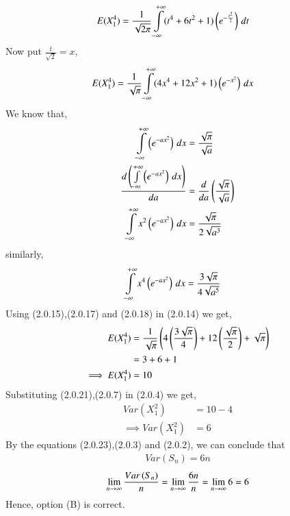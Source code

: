 \documentclass[journal,12pt,twocolumn]{IEEEtran}
\begin{document}
\begin{align}
    E(X_{1}^4)&=\frac{1}{\sqrt{2\pi}}\int\limits_{-\infty}^{+\infty}(t^{4}+6t^{2}+1)\left(e^{-\frac{t^{2}}{2}}\right)\,dt
\end{align}
Now put $\frac{t}{\sqrt{2}}=x$,
\begin{align}
    E(X_{1}^4)&=\frac{1}{\sqrt{\pi}}\int\limits_{-\infty}^{+\infty}(4x^{4}+12x^{2}+1)\left(e^{-x^{2}}\right)\,dx
\end{align}
We know that,
\begin{align}
\int\limits_{-\infty}^{+\infty}\left(e^{-ax^{2}}\right)\,dx&=\frac{\sqrt{\pi}}{\sqrt{a}}
\\\frac{d\left(\int\limits_{-\infty}^{+\infty}\left(e^{-ax^{2}}\right)\,dx\right)}{da}&=\frac{d}{da}\left(\frac{\sqrt{\pi}}{\sqrt{a}}\right)
\\\int\limits_{-\infty}^{+\infty}x^{2}\left(e^{-ax^{2}}\right)\,dx&=\frac{\sqrt{\pi}}{2\sqrt{a^3}}
\end{align}
similarly,
\begin{align}
    \int\limits_{-\infty}^{+\infty}x^{4}\left(e^{-ax^{2}}\right)\,dx&=\frac{3\sqrt{\pi}}{4\sqrt{a^5}}
\end{align}
Using (2.0.15),(2.0.17) and (2.0.18) in (2.0.14) we get,
\begin{align}
     E(X_{1}^4)&=\frac{1}{\sqrt{\pi}}\left(4\left(\frac{3\sqrt{\pi}}{4}\right)+12\left(\frac{\sqrt{\pi}}{2}\right)+\sqrt{\pi}\right)
     \\&=3+6+1
    \\\implies  E(X_{1}^4)&=10
\end{align}
Substituting (2.0.21),(2.0.7) in (2.0.4) we get,
\begin{align}
    Var(X_{1}^{2})&=10-4
    \\\implies Var(X_{1}^{2})&=6
\end{align}
By the equations (2.0.23),(2.0.3) and (2.0.2), we can conclude that 
\begin{align}
    Var(S_{n})=6n
\end{align}
$$\lim_{n \to \infty}{\frac{Var\left(S_{n}\right)}{n}}=\lim_{n \to \infty}{\frac{6n}{n}}=\lim_{n \to \infty}{6}=6$$
Hence, option (B) is correct.
\end{document}
